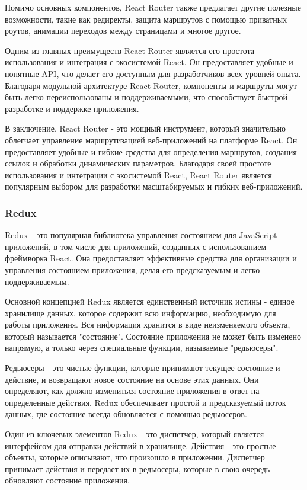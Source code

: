 Помимо основных компонентов, React Router также предлагает другие полезные возможности, такие как редиректы, защита маршрутов с помощью приватных роутов, анимации переходов между страницами и многое другое.

Одним из главных преимуществ React Router является его простота использования и интеграция с экосистемой React. Он предоставляет удобные и понятные API, что делает его доступным для разработчиков всех уровней опыта. Благодаря модульной архитектуре React Router, компоненты и маршруты могут быть легко переиспользованы и поддерживаемыми, что способствует быстрой разработке и поддержке приложения.

В заключение, React Router - это мощный инструмент, который значительно облегчает управление маршрутизацией веб-приложений на платформе React. Он предоставляет удобные и гибкие средства для определения маршрутов, создания ссылок и обработки динамических параметров. Благодаря своей простоте использования и интеграции с экосистемой React, React Router является популярным выбором для разработки масштабируемых и гибких веб-приложений.

\subsubsection{Redux}

Redux - это популярная библиотека управления состоянием для JavaScript-приложений, в том числе для приложений, созданных с использованием фреймворка React. Она предоставляет эффективные средства для организации и управления состоянием приложения, делая его предсказуемым и легко поддерживаемым.

Основной концепцией Redux является единственный источник истины - единое хранилище данных, которое содержит всю информацию, необходимую для работы приложения. Вся информация хранится в виде неизменяемого объекта, который называется "состояние". Состояние приложения не может быть изменено напрямую, а только через специальные функции, называемые "редьюсеры".

Редьюсеры - это чистые функции, которые принимают текущее состояние и действие, и возвращают новое состояние на основе этих данных. Они определяют, как должно измениться состояние приложения в ответ на определенные действия. Redux обеспечивает простой и предсказуемый поток данных, где состояние всегда обновляется с помощью редьюсеров.

Один из ключевых элементов Redux - это диспетчер, который является интерфейсом для отправки действий в хранилище. Действия - это простые объекты, которые описывают, что произошло в приложении. Диспетчер принимает действия и передает их в редьюсеры, которые в свою очередь обновляют состояние приложения.

